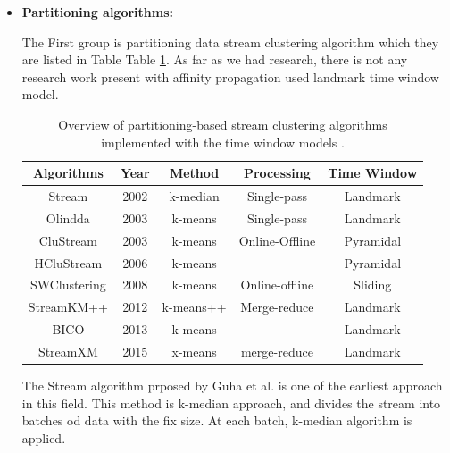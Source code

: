 \documentclass[../UNBThesis2.tex]{subfiles}
\begin{document}
\begin{itemize}
    \item\textbf{Partitioning algorithms:}


The First group is partitioning data stream clustering algorithm which they are listed in Table Table \ref{landmarkwin}. As far as we had research, there is not any research work present with affinity propagation used landmark time window model.


\begin{table}[h]
    \centering
    \caption{Overview of partitioning-based stream clustering algorithms implemented with the time window models \protect\cite{carnein2019optimizing, mansalis2018evaluation}. }
    \label{landmarkwin}
    \small
    \begin{tabular}{c c c c c}
    \hline
      \textbf{Algorithms} & \textbf{Year} & \textbf{ Method } & \textbf{Processing} & \textbf{ Time Window}  \\
     \hline \midrule

      Stream             &   2002        &   k-median        &  Single-pass      & Landmark \\
     \hline
     Olindda          &   2003        &   k-means         &   Single-pass     & Landmark \\
    \hline
     CluStream            &   2003        &  k-means       &  Online-Offline      & Pyramidal \\
    \hline   
     HCluStream           &    2006        &    k-means     &      & Pyramidal\\
    \hline    
     SWClustering       &    2008        &    k-means     &    Online-offline    & Sliding\\
       \hline
      StreamKM++       &    2012       &   k-means++ & Merge-reduce  & Landmark \\
    \hline 
      BICO               &    2013        &    k-means     &                     & Landmark\\
    \hline
     StreamXM            &   2015        &  x-means         &  merge-reduce      & Landmark \\
    \hline
\bottomrule
    \end{tabular}
\end{table}



The Stream algorithm prposed by Guha et al. \cite{o2002streaming} is one of the earliest approach in this field. This method is k-median approach, and divides the stream into batches od data with the fix size. At each batch, k-median algorithm is applied. 



\end{itemize}
\end{document}
